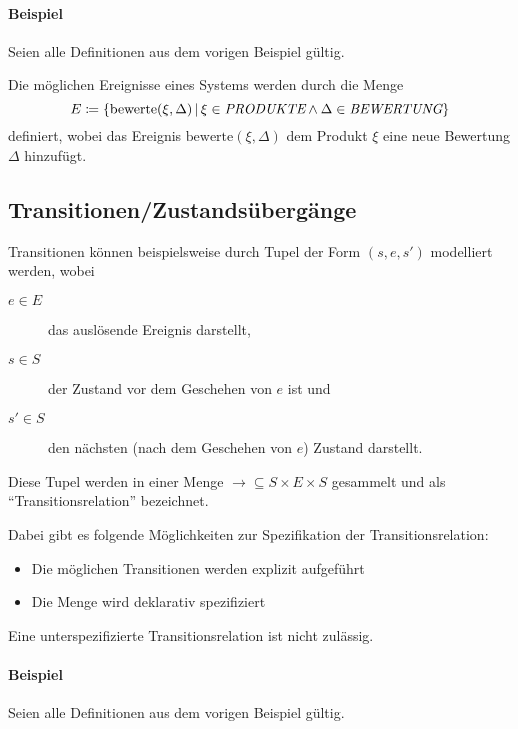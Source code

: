 															\paragraph{Beispiel}
																Seien alle Definitionen aus dem vorigen Beispiel gültig.

																Die möglichen Ereignisse eines Systems werden durch die Menge \[ E \coloneqq \{ \text{bewerte}(\xi, \Delta) \,\vert\, \xi \in \textit{PRODUKTE} \land \Delta \in \textit{BEWERTUNG} \} \] definiert, wobei das Ereignis $ \text{bewerte}(\xi, \Delta) $ dem Produkt $ \xi $ eine neue Bewertung $ \Delta $ hinzufügt.

														\subsection{Transitionen/Zustandsübergänge}
															Transitionen können beispielsweise durch Tupel der Form $ (s, e, s') $ modelliert werden, wobei
															\begin{description}
																\item[$ e \in E $] das auslösende Ereignis darstellt,
																\item[$ s \in S $] der Zustand vor dem Geschehen von $ e $ ist und
																\item[$ s' \in S $] den nächsten (nach dem Geschehen von $ e $) Zustand darstellt.
															\end{description}
															Diese Tupel werden in einer Menge $ \rightarrow \subseteq S \times E \times S $ gesammelt und als \enquote{Transitionsrelation} bezeichnet.

															Dabei gibt es folgende Möglichkeiten zur Spezifikation der Transitionsrelation:
															\begin{itemize}
																\item Die möglichen Transitionen werden explizit aufgeführt
																\item Die Menge wird deklarativ spezifiziert
															\end{itemize}
															Eine unterspezifizierte Transitionsrelation ist nicht zulässig.

															\paragraph{Beispiel}
																Seien alle Definitionen aus dem vorigen Beispiel gültig.


